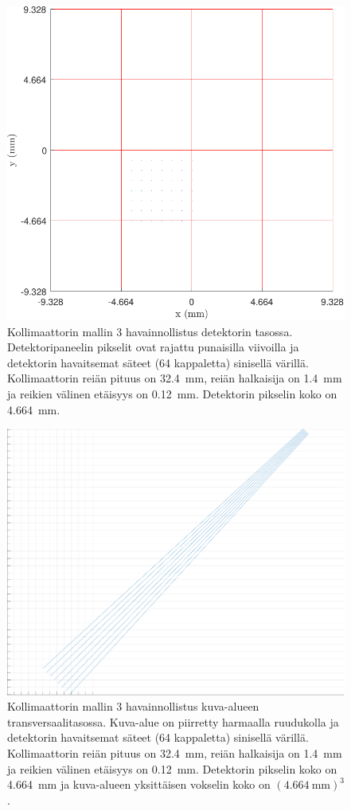 \begin{figure}[H]
    \centering
    \captionsetup{width=.9\linewidth}
    \includegraphics[width=.9\linewidth]{kuvat/malli3_2D.pdf}
    \caption{Kollimaattorin mallin 3 havainnollistus detektorin tasossa. Detektoripaneelin pikselit ovat rajattu punaisilla viivoilla ja detektorin havaitsemat säteet (64 kappaletta) sinisellä värillä. Kollimaattorin reiän pituus on \qty{32.4}{\milli\meter}, reiän halkaisija on \qty{1.4}{\milli\meter} ja reikien välinen etäisyys on \qty{0.12}{\milli\meter}. Detektorin pikselin koko on \qty{4.664}{\milli\meter}.}
    \label{fig:ray3_2D}
\end{figure}
\begin{figure}[H]
    \centering
    \captionsetup{width=.9\linewidth}
    \includegraphics[width=.9\linewidth]{kuvat/malli3_3D.pdf}
    \caption{Kollimaattorin mallin 3 havainnollistus kuva-alueen transversaalitasossa. Kuva-alue on piirretty harmaalla ruudukolla ja detektorin havaitsemat säteet (64 kappaletta) sinisellä värillä. Kollimaattorin reiän pituus on \qty{32.4}{\milli\meter}, reiän halkaisija on \qty{1.4}{\milli\meter} ja reikien välinen etäisyys on \qty{0.12}{\milli\meter}. Detektorin pikselin koko on \qty{4.664}{\milli\meter} ja kuva-alueen yksittäisen vokselin koko on $(\qty{4.664}{\milli\meter})^{3}$.}
    \label{fig:ray3_3D}
\end{figure}

